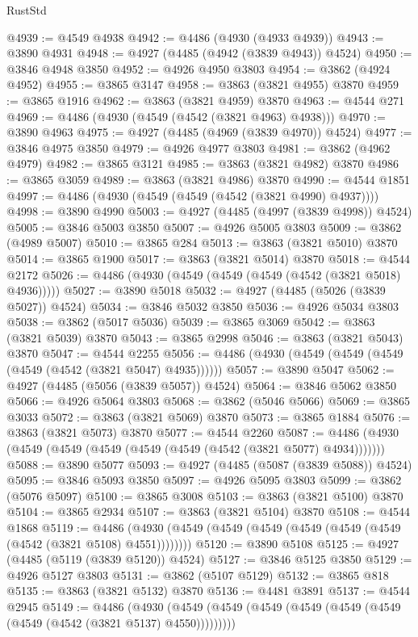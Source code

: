 \begin{lexlean}{RustStd}
\begin{coremodule}
@4939 := @4549 @4938
@4942 := @4486 (@4930 (@4933 @4939))
@4943 := @3890 @4931
@4948 := @4927 (@4485 (@4942 (@3839 @4943)) @4524)
@4950 := @3846 @4948 @3850
@4952 := @4926 @4950 @3803
@4954 := @3862 (@4924 @4952)
@4955 := @3865 @3147
@4958 := @3863 (@3821 @4955) @3870
@4959 := @3865 @1916
@4962 := @3863 (@3821 @4959) @3870
@4963 := @4544 @271
@4969 := @4486 (@4930 (@4549 (@4542 (@3821 @4963) @4938)))
@4970 := @3890 @4963
@4975 := @4927 (@4485 (@4969 (@3839 @4970)) @4524)
@4977 := @3846 @4975 @3850
@4979 := @4926 @4977 @3803
@4981 := @3862 (@4962 @4979)
@4982 := @3865 @3121
@4985 := @3863 (@3821 @4982) @3870
@4986 := @3865 @3059
@4989 := @3863 (@3821 @4986) @3870
@4990 := @4544 @1851
@4997 := @4486 (@4930 (@4549 (@4549 (@4542 (@3821 @4990) @4937))))
@4998 := @3890 @4990
@5003 := @4927 (@4485 (@4997 (@3839 @4998)) @4524)
@5005 := @3846 @5003 @3850
@5007 := @4926 @5005 @3803
@5009 := @3862 (@4989 @5007)
@5010 := @3865 @284
@5013 := @3863 (@3821 @5010) @3870
@5014 := @3865 @1900
@5017 := @3863 (@3821 @5014) @3870
@5018 := @4544 @2172
@5026 := @4486 (@4930 (@4549 (@4549 (@4549 (@4542 (@3821 @5018) @4936)))))
@5027 := @3890 @5018
@5032 := @4927 (@4485 (@5026 (@3839 @5027)) @4524)
@5034 := @3846 @5032 @3850
@5036 := @4926 @5034 @3803
@5038 := @3862 (@5017 @5036)
@5039 := @3865 @3069
@5042 := @3863 (@3821 @5039) @3870
@5043 := @3865 @2998
@5046 := @3863 (@3821 @5043) @3870
@5047 := @4544 @2255
@5056 := @4486 (@4930 (@4549 (@4549 (@4549 (@4549 (@4542 (@3821 @5047) @4935))))))
@5057 := @3890 @5047
@5062 := @4927 (@4485 (@5056 (@3839 @5057)) @4524)
@5064 := @3846 @5062 @3850
@5066 := @4926 @5064 @3803
@5068 := @3862 (@5046 @5066)
@5069 := @3865 @3033
@5072 := @3863 (@3821 @5069) @3870
@5073 := @3865 @1884
@5076 := @3863 (@3821 @5073) @3870
@5077 := @4544 @2260
@5087 := @4486 (@4930 (@4549 (@4549 (@4549 (@4549 (@4549 (@4542 (@3821 @5077) @4934)))))))
@5088 := @3890 @5077
@5093 := @4927 (@4485 (@5087 (@3839 @5088)) @4524)
@5095 := @3846 @5093 @3850
@5097 := @4926 @5095 @3803
@5099 := @3862 (@5076 @5097)
@5100 := @3865 @3008
@5103 := @3863 (@3821 @5100) @3870
@5104 := @3865 @2934
@5107 := @3863 (@3821 @5104) @3870
@5108 := @4544 @1868
@5119 := @4486 (@4930 (@4549 (@4549 (@4549 (@4549 (@4549 (@4549 (@4542 (@3821 @5108) @4551))))))))
@5120 := @3890 @5108
@5125 := @4927 (@4485 (@5119 (@3839 @5120)) @4524)
@5127 := @3846 @5125 @3850
@5129 := @4926 @5127 @3803
@5131 := @3862 (@5107 @5129)
@5132 := @3865 @818
@5135 := @3863 (@3821 @5132) @3870
@5136 := @4481 @3891
@5137 := @4544 @2945
@5149 := @4486
    (@4930 (@4549 (@4549 (@4549 (@4549 (@4549 (@4549 (@4549 (@4542 (@3821 @5137) @4550)))))))))

\end{coremodule}
\end{lexlean}
